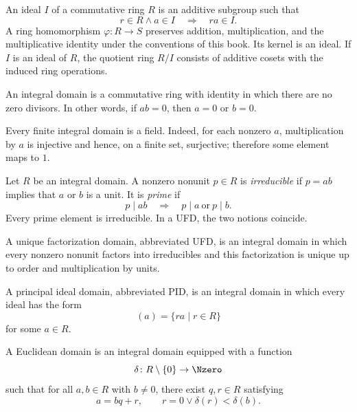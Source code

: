     \begin{definition}
        An ideal $I$ of a commutative ring $R$ is an additive subgroup such that
        \[
            r\in R\land a\in I
            \quad\Longrightarrow\quad
            ra\in I.
        \]
        A ring homomorphism $\varphi\colon R\to S$ preserves addition,
        multiplication, and the multiplicative identity under the conventions
        of this book. Its kernel is an ideal. If $I$ is an ideal of $R$, the
        quotient ring $R/I$ consists of additive cosets with the induced ring
        operations.
    \end{definition}

    \begin{definition}
        An integral domain is a commutative ring with identity in which there are
        no zero divisors. In other words, if $ab=0$, then $a=0$ or $b=0$.
    \end{definition}

    \begin{theorem}
        Every finite integral domain is a field. Indeed, for each nonzero
        $a$, multiplication by $a$ is injective and hence, on a finite set,
        surjective; therefore some element maps to $1$.
    \end{theorem}

    \begin{definition}
        Let $R$ be an integral domain. A nonzero nonunit $p\in R$ is
        \emph{irreducible} if $p=ab$ implies that $a$ or $b$ is a unit. It is
        \emph{prime} if
        \[
            p\mid ab
            \quad\Longrightarrow\quad
            p\mid a\ \text{or}\ p\mid b.
        \]
        Every prime element is irreducible. In a UFD, the two notions coincide.
    \end{definition}

    \begin{definition}
        A unique factorization domain, abbreviated UFD, is an integral domain in
        which every nonzero nonunit factors into irreducibles and this
        factorization is unique up to order and multiplication by units.

        A principal ideal domain, abbreviated PID, is an integral domain in
        which every ideal has the form
        \[
            (a)=\{ra\mid r\in R\}
        \]
        for some $a\in R$.

        A Euclidean domain is an integral domain equipped with a function
        \[
            \delta\colon R\setminus\{0\}\to\Nzero
        \]
        such that for all $a,b\in R$ with $b\neq0$, there exist $q,r\in R$
        satisfying
        \[
            a=bq+r,
            \qquad
            r=0\lor \delta(r)<\delta(b).
        \]
    \end{definition}

